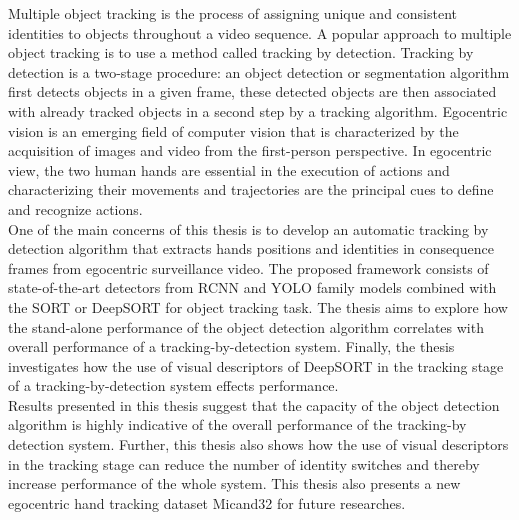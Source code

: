 % 
% 
%
Multiple object tracking is the process of assigning unique and consistent identities to objects throughout a video sequence. A popular approach to multiple object tracking is to use a method called tracking by detection. Tracking by detection is a two-stage procedure: an object detection or segmentation algorithm first detects objects in a given frame, these detected objects are then associated with already tracked objects in a second step by a tracking algorithm. Egocentric vision is an emerging field of computer vision that is characterized by the acquisition of images and video from the first-person perspective. In egocentric view, the two human hands are essential in the execution of actions and characterizing their movements and trajectories are the principal cues to define and recognize actions.
\\One of the main concerns of this thesis is to develop an automatic tracking by detection algorithm that extracts hands positions and identities in consequence frames from egocentric surveillance video. The proposed framework consists of state-of-the-art detectors from RCNN and YOLO family models combined with the SORT or DeepSORT for object tracking task. The thesis aims to explore how the stand-alone performance of the object detection algorithm correlates with overall performance of a tracking-by-detection system. Finally, the thesis investigates how the use of visual descriptors of DeepSORT in the tracking stage of a tracking-by-detection system effects performance.
\\Results presented in this thesis suggest that the capacity of the object detection algorithm is highly indicative of the overall performance of the tracking-by detection system. Further, this thesis also shows how the use of visual descriptors in the tracking stage can reduce the number of identity switches and thereby increase performance of the whole system. This thesis also presents a new egocentric hand tracking dataset Micand32 for future researches.

